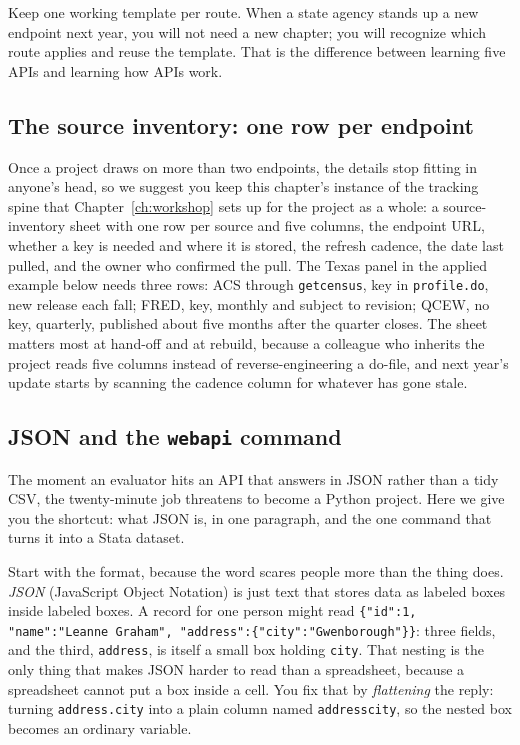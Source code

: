 \documentclass[
    a4paper,
    fontsize=10pt,
    twoside=true,
    numbers=noenddot,
]{kaobook}
\begin{document}
Keep one working template per route. When a state agency stands up a new endpoint next year, you will not need a new chapter; you will recognize which route applies and reuse the template. That is the difference between learning five APIs and learning how APIs work.

\subsection{The source inventory: one row per endpoint}\label{ch03-sc-inventory}
Once a project draws on more than two endpoints, the details stop fitting in anyone's head, so we suggest you keep this chapter's instance of the tracking spine that Chapter~\ref{ch:workshop} sets up for the project as a whole: a source-inventory sheet with one row per source and five columns, the endpoint URL, whether a key is needed and where it is stored, the refresh cadence, the date last pulled, and the owner who confirmed the pull. The Texas panel in the applied example below needs three rows: ACS through \texttt{getcensus}, key in \texttt{profile.do}, new release each fall; FRED, key, monthly and subject to revision; QCEW, no key, quarterly, published about five months after the quarter closes. The sheet matters most at hand-off and at rebuild, because a colleague who inherits the project reads five columns instead of reverse-engineering a do-file, and next year's update starts by scanning the cadence column for whatever has gone stale.

\subsection{JSON and the \texttt{webapi} command}\label{sec:webapi}
The moment an evaluator hits an API that answers in JSON rather than a tidy CSV, the twenty-minute job threatens to become a Python project. Here we give you the shortcut: what JSON is, in one paragraph, and the one command that turns it into a Stata dataset.

Start with the format, because the word scares people more than the thing does. \emph{JSON} (JavaScript Object Notation) is just text that stores data as labeled boxes inside labeled boxes. A record for one person might read \texttt{\{"id":1, "name":"Leanne Graham", "address":\{"city":"Gwenborough"\}\}}: three fields, and the third, \texttt{address}, is itself a small box holding \texttt{city}. That nesting is the only thing that makes JSON harder to read than a spreadsheet, because a spreadsheet cannot put a box inside a cell. You fix that by \emph{flattening} the reply: turning \texttt{address.city} into a plain column named \texttt{addresscity}, so the nested box becomes an ordinary variable.
\end{document}
